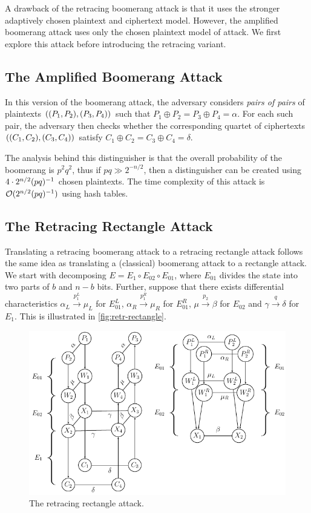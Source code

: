 \documentclass[twoside]{article}
\begin{document}
A drawback of the retracing boomerang attack is that it uses the stronger
adaptively chosen plaintext and ciphertext model. However, the amplified
boomerang attack uses only the chosen plaintext model of attack. We first
explore this attack before introducing the retracing variant.

\subsection{The Amplified Boomerang Attack}

In this version of the boomerang attack, the adversary considers \emph{pairs of
pairs} of plaintexts \(((P_1, P_2), (P_3, P_4))\) such that \(P_1
\oplus P_2 = P_3 \oplus P_4 = \alpha\). For each such pair, the adversary then
checks whether the corresponding quartet of ciphertexts \(((C_1, C_2),
(C_3, C_4))\) satisfy \(C_1 \oplus C_2 = C_3 \oplus C_4 = \delta\).

The analysis behind this distinguisher is that the overall probability of the
boomerang is \(p^2q^2\), thus if \(pq \gg 2^{-n/2}\), then a distinguisher can
be created using \(4 \cdot 2^{n/2}(pq)^{-1}\) chosen plaintexts. The time
complexity of this attack is \(\mathcal O(2^{n/2}(pq)^{-1})\) using hash
tables.

\subsection{The Retracing Rectangle Attack}

Translating a retracing boomerang attack to a retracing rectangle attack follows
the same idea as translating a (classical) boomerang attack to a rectangle
attack. We start with decomposing \(E = E_1 \circ E_{02} \circ E_{01}\), where
\(E_{01}\) divides the state into two parts of \(b\) and \(n - b\) bits.
Further, suppose that there exists differential characteristics \(\alpha_L
\xrightarrow{p_1^L} \mu_L\) for \(E_{01}^L\), \(\alpha_R \xrightarrow{p_1^R}
\mu_R\) for \(E_{01}^R\), \(\mu \xrightarrow{p_2} \beta\) for \(E_{02}\) and
\(\gamma \xrightarrow{q} \delta\) for \(E_1\). This is illustrated in
\autoref{fig:retr-rectangle}.

\begin{figure}
    \centering
    \includegraphics[width=0.6\columnwidth]{images/retracing_rectangle.png}
    \caption{The retracing rectangle attack.}
    \label{fig:retr-rectangle}
\end{figure}
\end{document}
